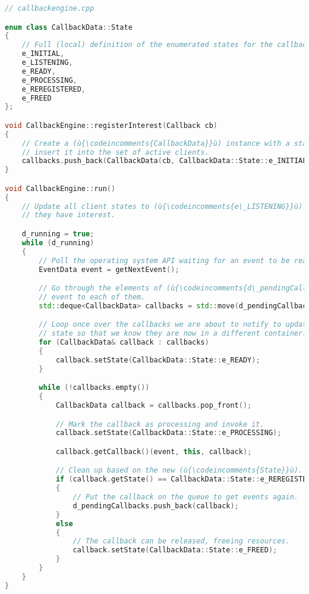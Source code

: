 \begin{lstlisting}[language=C++]
// callbackengine.cpp

enum class CallbackData::State
{
    // Full (local) definition of the enumerated states for the callback engine.
    e_INITIAL,
    e_LISTENING,
    e_READY,
    e_PROCESSING,
    e_REREGISTERED,
    e_FREED
};

void CallbackEngine::registerInterest(Callback cb)
{
    // Create a (ù{\codeincomments{CallbackData}}ù) instance with a state of (ù{\codeincomments{e\_INITIAL}}ù) and
    // insert it into the set of active clients.
    callbacks.push_back(CallbackData(cb, CallbackData::State::e_INITIAL));
}

void CallbackEngine::run()
{
    // Update all client states to (ù{\codeincomments{e\_LISTENING}}ù) based on the events in which
    // they have interest.

    d_running = true;
    while (d_running)
    {
        // Poll the operating system API waiting for an event to be ready.
        EventData event = getNextEvent();

        // Go through the elements of (ù{\codeincomments{d\_pendingCallbacks}}ù) to deliver this
        // event to each of them.
        std::deque<CallbackData> callbacks = std::move(d_pendingCallbacks);

        // Loop once over the callbacks we are about to notify to update their
        // state so that we know they are now in a different container.
        for (CallbackData& callback : callbacks)
        {
            callback.setState(CallbackData::State::e_READY);
        }

        while (!callbacks.empty())
        {
            CallbackData callback = callbacks.pop_front();

            // Mark the callback as processing and invoke it.
            callback.setState(CallbackData::State::e_PROCESSING);

            callback.getCallback()(event, this, callback);

            // Clean up based on the new (ù{\codeincomments{State}}ù).
            if (callback.getState() == CallbackData::State::e_REREGISTERED)
            {
                // Put the callback on the queue to get events again.
                d_pendingCallbacks.push_back(callback);
            }
            else
            {
                // The callback can be released, freeing resources.
                callback.setState(CallbackData::State::e_FREED);
            }
        }
    }
}


\end{lstlisting}
